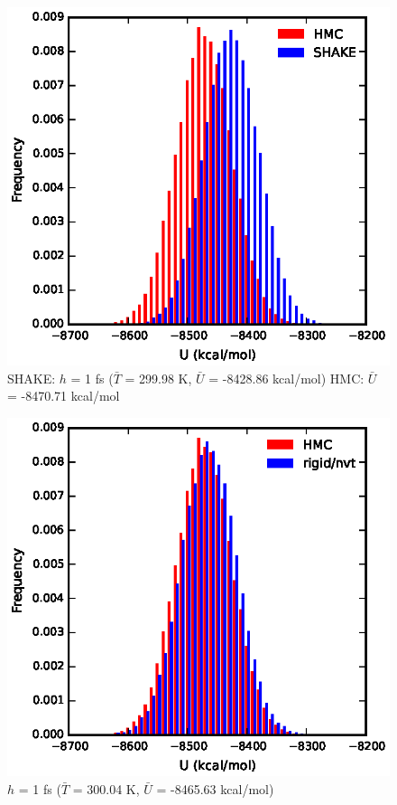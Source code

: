 \documentclass[
journal=jctcce,
layout=twocolumn
]{achemso}
\newcommand{\timestep}{h}
\begin{document}
\begin{figure}
    \caption{SHAKE: $\timestep$ = 1 fs ($\bar{T}$ = 299.98 K, $\bar{U}$ = -8428.86 kcal/mol) HMC: $\bar{U}$ = -8470.71 kcal/mol  }
	\includegraphics{potenergy}
\end{figure}

\begin{figure}
    \caption{$\timestep$ = 1 fs ($\bar{T}$ = 300.04 K, $\bar{U}$ = -8465.63 kcal/mol)}
	\includegraphics{potenergy2}
\end{figure}
\end{document}
